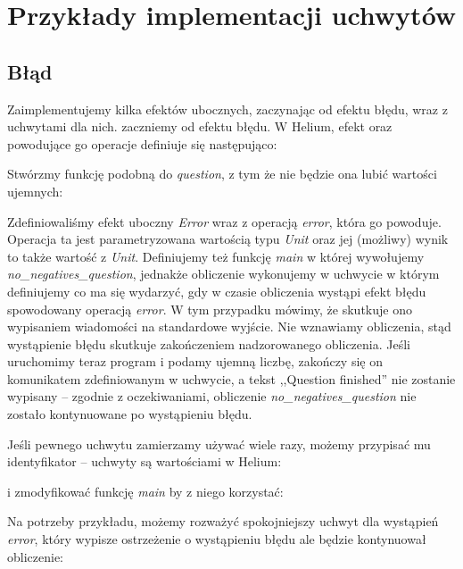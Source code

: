 \section{Przykłady implementacji uchwytów}

\subsection{Błąd}

Zaimplementujemy kilka efektów ubocznych, zaczynając od efektu błędu, wraz z uchwytami dla nich. zaczniemy od efektu błędu. W Helium, efekt oraz powodujące go operacje definiuje się następująco:



Stwórzmy funkcję podobną do \textit{question}, z tym że nie będzie ona lubić wartości ujemnych:



Zdefiniowaliśmy efekt uboczny \textit{Error} wraz z operacją \textit{error}, która go powoduje. Operacja ta jest parametryzowana wartością typu \textit{Unit} oraz jej (możliwy) wynik to także wartość z \textit{Unit}. Definiujemy też funkcję \textit{main} w której wywołujemy \textit{no\_negatives\_question}, jednakże obliczenie wykonujemy w uchwycie w którym definiujemy co ma się wydarzyć, gdy w czasie obliczenia wystąpi efekt błędu spowodowany operacją \textit{error}. W tym przypadku mówimy, że skutkuje ono wypisaniem wiadomości na standardowe wyjście. Nie wznawiamy obliczenia, stąd wystąpienie błędu skutkuje zakończeniem nadzorowanego obliczenia. Jeśli uruchomimy teraz program i podamy ujemną liczbę, zakończy się on komunikatem zdefiniowanym w uchwycie, a tekst ,,Question finished'' nie zostanie wypisany -- zgodnie z oczekiwaniami, obliczenie \textit{no\_negatives\_question} nie zostało kontynuowane po wystąpieniu błędu.

Jeśli pewnego uchwytu zamierzamy używać wiele razy, możemy przypisać mu identyfikator -- uchwyty są wartościami w Helium:



i zmodyfikować funkcję \textit{main} by z niego korzystać:



Na potrzeby przykładu, możemy rozważyć spokojniejszy uchwyt dla wystąpień \textit{error}, który wypisze ostrzeżenie o wystąpieniu błędu ale będzie kontynuował obliczenie:

